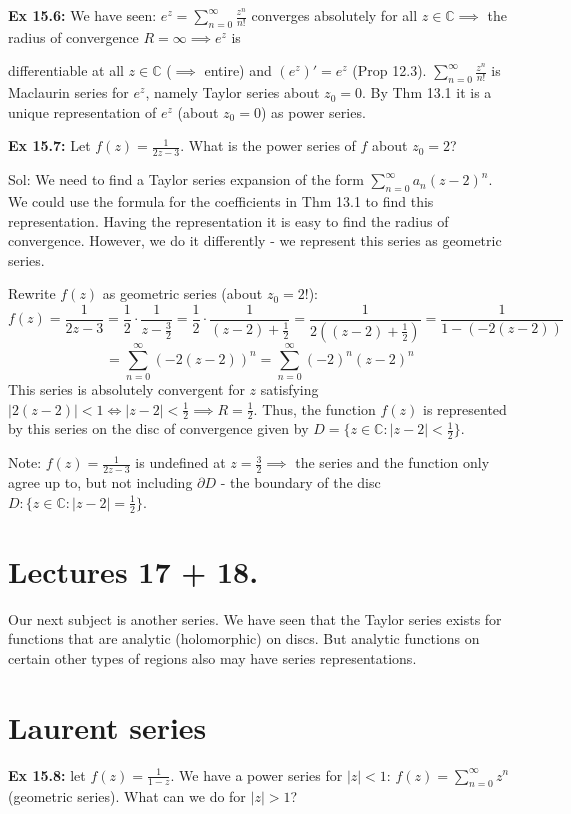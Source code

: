 \documentclass{article}
\begin{document}
\textbf{Ex 15.6:} We have seen: $e^z = \sum_{n=0}^{\infty} \frac{z^n}{n!}$ converges absolutely for all $z \in \mathbb{C} \implies$ the radius of convergence $R = \infty \implies e^z$ is

differentiable at all $z \in \mathbb{C}$ ($\implies$ entire) and $(e^z)' = e^z$ (Prop 12.3). $\sum_{n=0}^{\infty} \frac{z^n}{n!}$ is Maclaurin series for $e^z$, namely Taylor series about $z_0 = 0$. By Thm 13.1 it is a unique representation of $e^z$ (about $z_0 = 0$) as power series.

\textbf{Ex 15.7:} Let $f(z) = \frac{1}{2z-3}$. What is the power series of $f$ about $z_0 = 2$?

Sol: We need to find a Taylor series expansion of the form $\sum_{n=0}^{\infty} a_n (z-2)^n$. We could use the formula for the coefficients in Thm 13.1 to find this representation. Having the representation it is easy to find the radius of convergence. However, we do it differently - we represent this series as geometric series.

Rewrite $f(z)$ as geometric series (about $z_0 = 2$!):
$$ f(z) = \frac{1}{2z-3} = \frac{1}{2} \cdot \frac{1}{z - \frac{3}{2}} = \frac{1}{2} \cdot \frac{1}{(z-2) + \frac{1}{2}} = \frac{1}{2((z-2) + \frac{1}{2})} = \frac{1}{1 - (-2(z-2))} $$
$$ = \sum_{n=0}^{\infty} (-2(z-2))^n = \sum_{n=0}^{\infty} (-2)^n (z-2)^n $$
This series is absolutely convergent for $z$ satisfying $|2(z-2)| < 1 \iff |z-2| < \frac{1}{2} \implies R = \frac{1}{2}$. Thus, the function $f(z)$ is represented by this series on the disc of convergence given by $D = \{z \in \mathbb{C}: |z-2| < \frac{1}{2}\}$.

Note: $f(z) = \frac{1}{2z-3}$ is undefined at $z = \frac{3}{2} \implies$ the series and the function only agree up to, but not including $\partial D$ - the boundary of the disc $D: \{z \in \mathbb{C}: |z-2| = \frac{1}{2}\}$.

\section*{Lectures 17 + 18.}
Our next subject is another series. We have seen that the Taylor series exists for functions that are analytic (holomorphic) on discs. But analytic functions on certain other types of regions also may have series representations.

\section{Laurent series}
\textbf{Ex 15.8:} let $f(z) = \frac{1}{1-z}$. We have a power series for $|z| < 1$: $f(z) = \sum_{n=0}^{\infty} z^n$ (geometric series). What can we do for $|z| > 1$?
\end{document}
